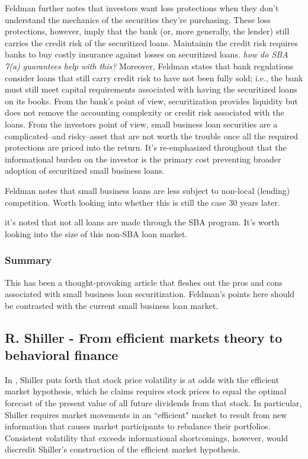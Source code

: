 Feldman further notes that investors want loss protections when they don't understand the mechanics of the securities they're purchasing.  These loss protections, however, imply that the bank (or, more generally, the lender) still carries the credit risk of the securitized loans.  Maintainin the credit risk requires banks to buy costly insurance against losses on securitized loans.  \note{[Consider]:} {\it how do SBA 7(a) guarantees help with this?}  Moreover, Feldman states that bank regulations consider loans that still carry credit risk to have not been fully sold; i.e., the bank must still meet capital requirements associated with having the securitized loans on its books.  From the bank's point of view, securitization provides liquidity but does not remove the accounting complexity or credit risk associated with the loans.  From the investors point of view, small business loan securities are a complicated--and risky--asset that are not worth the trouble once all the required protections are priced into the return.  It's re-emphasized throughout that the informational burden on the investor is the primary cost preventing broader adoption of securitized small business loans.

\note{[Competition]:} Feldman notes that small business loans are less subject to non-local (lending) competition.  Worth looking into whether this is still the case 30 years later.

 it's noted that not all loans are made through the SBA program.  It's worth looking into the size of this non-SBA loan market.


\subsubsection{Summary}

This has been a thought-provoking article that fleshes out the pros and cons associated with small business loan securitization.  Feldman's points here should be contrasted with the current small business loan market.


\subsection{R. Shiller - From efficient markets theory to behavioral finance}

In \cite{Shiller2003}, Shiller puts forth that stock price volatility is at odds with the efficient market hypothesis, which he claims requires stock prices to equal the optimal forecast of the present value of all future dividends from that stock.  In particular, Shiller requires market movements in an ``efficient" market to result from new information that causes market participants to rebalance their portfolios.  Consistent volatility that exceeds informational shortcomings, however, would discredit Shiller's construction of the efficient market hypothesis.

